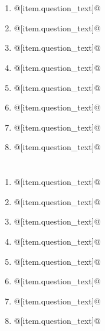 \documentclass[uplatex,a4j,11pt]{jsarticle}
\begin{document}
\begin{minipage}[t][6cm][t]{\linewidth}
\section{}
\begin{multicols}{2}
\begin{enumerate}
    \item @[item.question\_text]@
    \item @[item.question\_text]@
    \item @[item.question\_text]@
    \item @[item.question\_text]@
    \item @[item.question\_text]@
    \item @[item.question\_text]@
    \item @[item.question\_text]@
    \item @[item.question\_text]@
\end{enumerate}
\vfill
\end{multicols}
\end{minipage}
\begin{minipage}[t][6cm][t]{\linewidth}
  \section{}
  \begin{multicols}{2}
  \begin{enumerate}
      \item @[item.question\_text]@
      \item @[item.question\_text]@
      \item @[item.question\_text]@
      \item @[item.question\_text]@
      \item @[item.question\_text]@
      \item @[item.question\_text]@
      \item @[item.question\_text]@
      \item @[item.question\_text]@
  \end{enumerate}
  \vfill
  \end{multicols}
\end{minipage}
\end{document}
